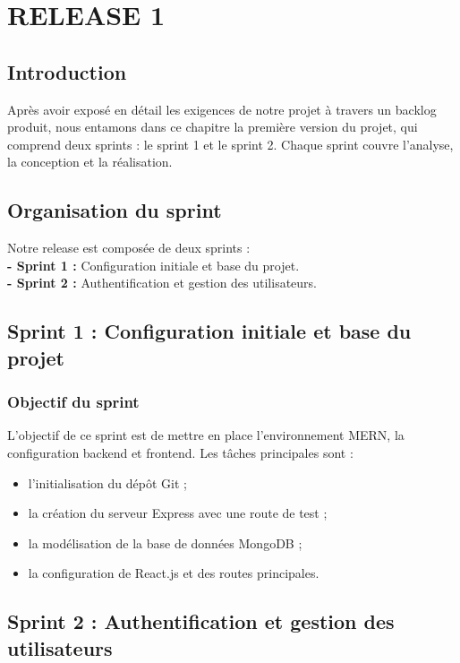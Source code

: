\chapter{RELEASE 1}

\section*{Introduction}
Après avoir exposé en détail les exigences de notre projet à travers un backlog produit, nous entamons dans ce chapitre la première version du projet, qui comprend deux sprints : le sprint 1 et le sprint 2. Chaque sprint couvre l'analyse, la conception et la réalisation.

\section{Organisation du sprint}
Notre release est composée de deux sprints :\\
\textbf{- Sprint 1 :} Configuration initiale et base du projet.\\
\textbf{- Sprint 2 :} Authentification et gestion des utilisateurs.

\section{Sprint 1 : Configuration initiale et base du projet}
\subsection{Objectif du sprint}
L'objectif de ce sprint est de mettre en place l'environnement MERN, la configuration backend et frontend. Les tâches principales sont :
\begin{itemize}
    \item l'initialisation du dépôt Git ;
    \item la création du serveur Express avec une route de test ;
    \item la modélisation de la base de données MongoDB ;
    \item la configuration de React.js et des routes principales.
\end{itemize}

\section{Sprint 2 : Authentification et gestion des utilisateurs}
